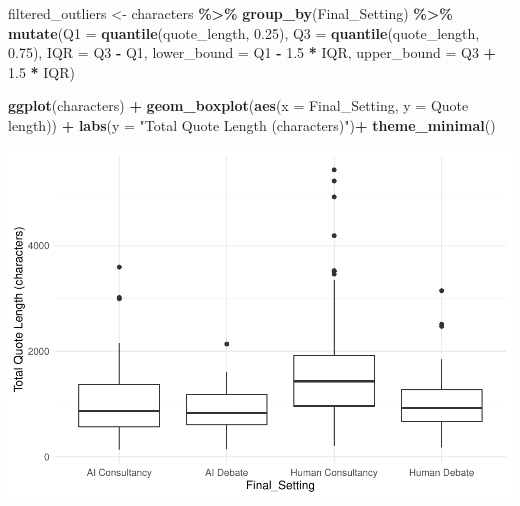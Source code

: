 \documentclass[
]{article}
\newenvironment{Shaded}{\begin{snugshade}}{\end{snugshade}}
\newcommand{\AttributeTok}[1]{\textcolor[rgb]{0.13,0.29,0.53}{#1}}
\newcommand{\FloatTok}[1]{\textcolor[rgb]{0.00,0.00,0.81}{#1}}
\newcommand{\FunctionTok}[1]{\textcolor[rgb]{0.13,0.29,0.53}{\textbf{#1}}}
\newcommand{\NormalTok}[1]{#1}
\newcommand{\OtherTok}[1]{\textcolor[rgb]{0.56,0.35,0.01}{#1}}
\newcommand{\SpecialCharTok}[1]{\textcolor[rgb]{0.81,0.36,0.00}{\textbf{#1}}}
\newcommand{\StringTok}[1]{\textcolor[rgb]{0.31,0.60,0.02}{#1}}
\begin{document}
\begin{Shaded}
\begin{Highlighting}[]
\NormalTok{filtered\_outliers }\OtherTok{\textless{}{-}}\NormalTok{ characters }\SpecialCharTok{\%\textgreater{}\%}
  \FunctionTok{group\_by}\NormalTok{(Final\_Setting) }\SpecialCharTok{\%\textgreater{}\%}
  \FunctionTok{mutate}\NormalTok{(}\AttributeTok{Q1 =} \FunctionTok{quantile}\NormalTok{(quote\_length, }\FloatTok{0.25}\NormalTok{),}
         \AttributeTok{Q3 =} \FunctionTok{quantile}\NormalTok{(quote\_length, }\FloatTok{0.75}\NormalTok{),}
         \AttributeTok{IQR =}\NormalTok{ Q3 }\SpecialCharTok{{-}}\NormalTok{ Q1,}
         \AttributeTok{lower\_bound =}\NormalTok{ Q1 }\SpecialCharTok{{-}} \FloatTok{1.5} \SpecialCharTok{*}\NormalTok{ IQR,}
         \AttributeTok{upper\_bound =}\NormalTok{ Q3 }\SpecialCharTok{+} \FloatTok{1.5} \SpecialCharTok{*}\NormalTok{ IQR)}

\FunctionTok{ggplot}\NormalTok{(characters) }\SpecialCharTok{+}
  \FunctionTok{geom\_boxplot}\NormalTok{(}\FunctionTok{aes}\NormalTok{(}\AttributeTok{x =}\NormalTok{ Final\_Setting, }\AttributeTok{y =} \StringTok{\textasciigrave{}}\AttributeTok{Quote length}\StringTok{\textasciigrave{}}\NormalTok{)) }\SpecialCharTok{+}
  \FunctionTok{labs}\NormalTok{(}\AttributeTok{y =} \StringTok{"Total Quote Length (characters)"}\NormalTok{)}\SpecialCharTok{+}
  \FunctionTok{theme\_minimal}\NormalTok{()}
\end{Highlighting}
\end{Shaded}

\includegraphics[width=1\linewidth]{debate-2309_files/figure-latex/quote_length graph-2}
\end{document}
